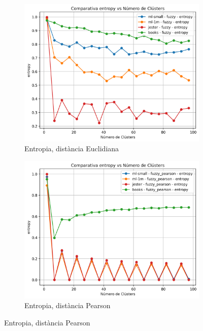 \documentclass[a4paper,12pt]{report}
\begin{document}
\begin{figure}[H]
    \vspace{1em}

    \begin{subfigure}[b]{0.49\textwidth}
        \includegraphics[width=\textwidth]{Figuras/entropy-fuzzy-all.png}
        \caption{Entropia, distància Euclidiana}
        \label{fig:fuzzy-clustering-results-e}
    \end{subfigure}
    \hfill
    \begin{subfigure}[b]{0.49\textwidth}
        \includegraphics[width=\textwidth]{Figuras/entropy-fuzzy_pearson-all.png}
        \caption{Entropia, distància Pearson}
        \label{fig:fuzzy-clustering-results-f}
    \end{subfigure}


\end{figure}
\end{document}
